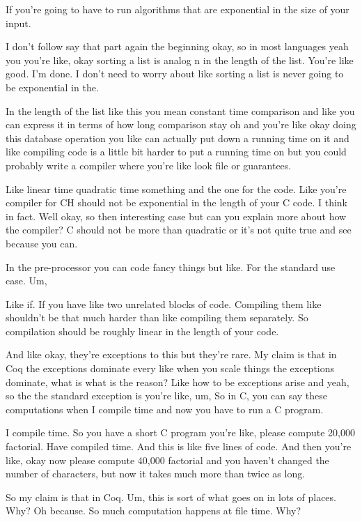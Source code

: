 \begin{subappendices}
    If you're going to have to run algorithms that are exponential in the size of your input. 
    
    I don't follow say that part again the beginning okay, so in most languages yeah you you're like, okay sorting a list is analog n in the length of the list. You're like good. I'm done. I don't need to worry about like sorting a list is never going to be exponential in the. 
    
    In the length of the list like this you mean constant time comparison and like you can express it in terms of how long comparison stay oh and you're like okay doing this database operation you like can actually put down a running time on it and like compiling code is a little bit harder to put a running time on but you could probably write a compiler where you're like look file or guarantees. 
    
    Like linear time quadratic time something and the one for the code. Like you're compiler for CH should not be exponential in the length of your C code. I think in fact. Well okay, so then interesting case but can you explain more about how the compiler? C should not be more than quadratic or it's not quite true and see because you can. 
    
    In the pre-processor you can code fancy things but like. For the standard use case. Um, 
    
    Like if. If you have like two unrelated blocks of code. Compiling them like shouldn't be that much harder than like compiling them separately. So compilation should be roughly linear in the length of your code. 
    
    And like okay, they're exceptions to this but they're rare. My claim is that in Coq the exceptions dominate every like when you scale things the exceptions dominate, what is what is the reason? Like how to be exceptions arise and yeah, so the the standard exception is you're like, um, So in C, you can say these computations when I compile time and now you have to run a C program. 
    
    I compile time. So you have a short C program you're like, please compute 20,000 factorial. Have compiled time. And this is like five lines of code. And then you're like, okay now please compute 40,000 factorial and you haven't changed the number of characters, but now it takes much more than twice as long. 
    
    So my claim is that in Coq. Um, this is sort of what goes on in lots of places. Why? Oh because. So much computation happens at file time. Why? 
    

\end{subappendices}
